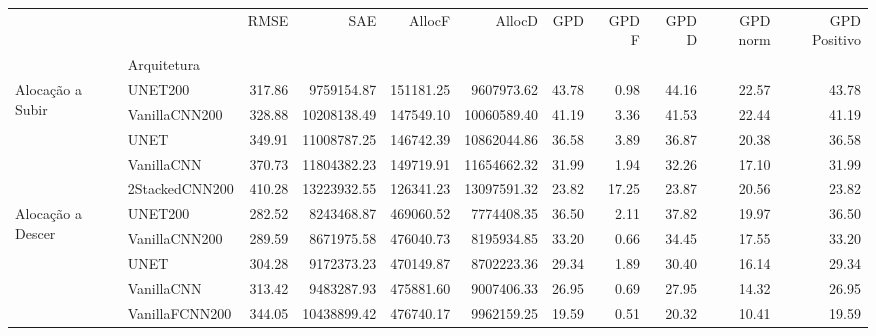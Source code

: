 \begin{tabular}{llrrrrrrrrr}
\toprule
 &  & RMSE & SAE & AllocF & AllocD & GPD & GPD F & GPD D & GPD norm & GPD Positivo \\
 & Arquitetura &  &  &  &  &  &  &  &  &  \\
\midrule
\multirow[t]{5}{*}{Alocação a Subir} & UNET200 & 317.86 & 9759154.87 & 151181.25 & 9607973.62 & 43.78 & 0.98 & 44.16 & 22.57 & 43.78 \\
 & VanillaCNN200 & 328.88 & 10208138.49 & 147549.10 & 10060589.40 & 41.19 & 3.36 & 41.53 & 22.44 & 41.19 \\
 & UNET & 349.91 & 11008787.25 & 146742.39 & 10862044.86 & 36.58 & 3.89 & 36.87 & 20.38 & 36.58 \\
 & VanillaCNN & 370.73 & 11804382.23 & 149719.91 & 11654662.32 & 31.99 & 1.94 & 32.26 & 17.10 & 31.99 \\
 & 2StackedCNN200 & 410.28 & 13223932.55 & 126341.23 & 13097591.32 & 23.82 & 17.25 & 23.87 & 20.56 & 23.82 \\
\cline{1-11}
\multirow[t]{5}{*}{Alocação a Descer} & UNET200 & 282.52 & 8243468.87 & 469060.52 & 7774408.35 & 36.50 & 2.11 & 37.82 & 19.97 & 36.50 \\
 & VanillaCNN200 & 289.59 & 8671975.58 & 476040.73 & 8195934.85 & 33.20 & 0.66 & 34.45 & 17.55 & 33.20 \\
 & UNET & 304.28 & 9172373.23 & 470149.87 & 8702223.36 & 29.34 & 1.89 & 30.40 & 16.14 & 29.34 \\
 & VanillaCNN & 313.42 & 9483287.93 & 475881.60 & 9007406.33 & 26.95 & 0.69 & 27.95 & 14.32 & 26.95 \\
 & VanillaFCNN200 & 344.05 & 10438899.42 & 476740.17 & 9962159.25 & 19.59 & 0.51 & 20.32 & 10.41 & 19.59 \\
\cline{1-11}
\bottomrule
\end{tabular}

